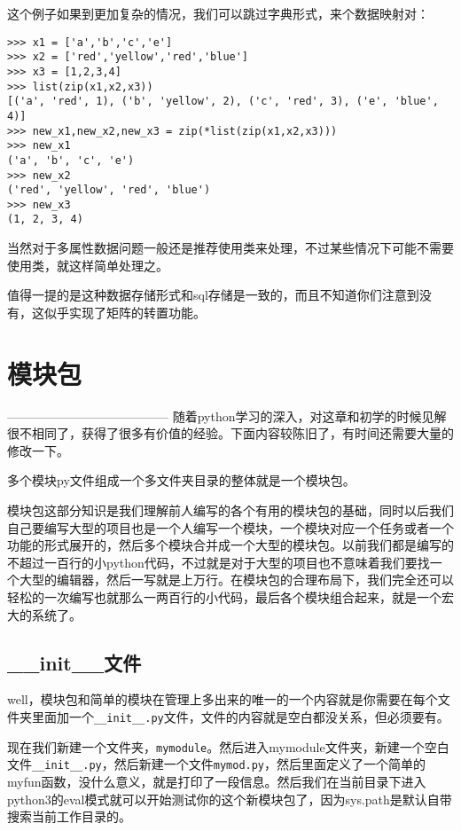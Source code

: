 \documentclass[12pt,oneside]{book}
\begin{document}
\begin{common-format}
这个例子如果到更加复杂的情况，我们可以跳过字典形式，来个数据映射对：
\begin{Verbatim}
>>> x1 = ['a','b','c','e']
>>> x2 = ['red','yellow','red','blue']
>>> x3 = [1,2,3,4]
>>> list(zip(x1,x2,x3))
[('a', 'red', 1), ('b', 'yellow', 2), ('c', 'red', 3), ('e', 'blue', 4)]
>>> new_x1,new_x2,new_x3 = zip(*list(zip(x1,x2,x3)))
>>> new_x1
('a', 'b', 'c', 'e')
>>> new_x2
('red', 'yellow', 'red', 'blue')
>>> new_x3
(1, 2, 3, 4)
\end{Verbatim}

当然对于多属性数据问题一般还是推荐使用类来处理，不过某些情况下可能不需要使用类，就这样简单处理之。

值得一提的是这种数据存储形式和sql存储是一致的，而且不知道你们注意到没有，这似乎实现了矩阵的转置功能。



\chapter{模块包}
---------------------------------------
随着python学习的深入，对这章和初学的时候见解很不相同了，获得了很多有价值的经验。下面内容较陈旧了，有时间还需要大量的修改一下。






多个模块py文件组成一个多文件夹目录的整体就是一个模块包。

模块包这部分知识是我们理解前人编写的各个有用的模块包的基础，同时以后我们自己要编写大型的项目也是一个人编写一个模块，一个模块对应一个任务或者一个功能的形式展开的，然后多个模块合并成一个大型的模块包。以前我们都是编写的不超过一百行的小python代码，不过就是对于大型的项目也不意味着我们要找一个大型的编辑器，然后一写就是上万行。在模块包的合理布局下，我们完全还可以轻松的一次编写也就那么一两百行的小代码，最后各个模块组合起来，就是一个宏大的系统了。

\section{\_{}\_{}init\_{}\_{}文件}
well，模块包和简单的模块在管理上多出来的唯一的一个内容就是你需要在每个文件夹里面加一个\verb+__init__.py+文件，文件的内容就是空白都没关系，但必须要有。

现在我们新建一个文件夹，\verb+mymodule+。然后进入mymodule文件夹，新建一个空白文件\verb+__init__.py+，然后新建一个文件\verb+mymod.py+，然后里面定义了一个简单的myfun函数，没什么意义，就是打印了一段信息。然后我们在当前目录下进入python3的eval模式就可以开始测试你的这个新模块包了，因为sys.path是默认自带搜索当前工作目录的。


\end{common-format}
\end{document}
